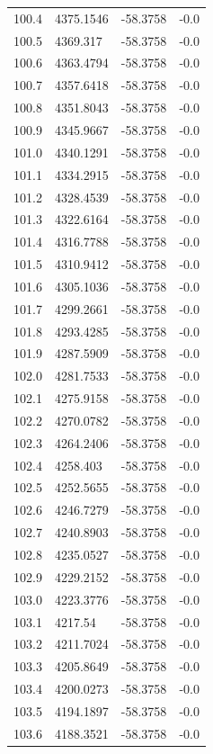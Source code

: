 \begin{table}[H]
\begin{tabular}{llll}
100.4 & 4375.1546 & -58.3758 & -0.0 \\
100.5 & 4369.317 & -58.3758 & -0.0 \\
100.6 & 4363.4794 & -58.3758 & -0.0 \\
100.7 & 4357.6418 & -58.3758 & -0.0 \\
100.8 & 4351.8043 & -58.3758 & -0.0 \\
100.9 & 4345.9667 & -58.3758 & -0.0 \\
101.0 & 4340.1291 & -58.3758 & -0.0 \\
101.1 & 4334.2915 & -58.3758 & -0.0 \\
101.2 & 4328.4539 & -58.3758 & -0.0 \\
101.3 & 4322.6164 & -58.3758 & -0.0 \\
101.4 & 4316.7788 & -58.3758 & -0.0 \\
101.5 & 4310.9412 & -58.3758 & -0.0 \\
101.6 & 4305.1036 & -58.3758 & -0.0 \\
101.7 & 4299.2661 & -58.3758 & -0.0 \\
101.8 & 4293.4285 & -58.3758 & -0.0 \\
101.9 & 4287.5909 & -58.3758 & -0.0 \\
102.0 & 4281.7533 & -58.3758 & -0.0 \\
102.1 & 4275.9158 & -58.3758 & -0.0 \\
102.2 & 4270.0782 & -58.3758 & -0.0 \\
102.3 & 4264.2406 & -58.3758 & -0.0 \\
102.4 & 4258.403 & -58.3758 & -0.0 \\
102.5 & 4252.5655 & -58.3758 & -0.0 \\
102.6 & 4246.7279 & -58.3758 & -0.0 \\
102.7 & 4240.8903 & -58.3758 & -0.0 \\
102.8 & 4235.0527 & -58.3758 & -0.0 \\
102.9 & 4229.2152 & -58.3758 & -0.0 \\
103.0 & 4223.3776 & -58.3758 & -0.0 \\
103.1 & 4217.54 & -58.3758 & -0.0 \\
103.2 & 4211.7024 & -58.3758 & -0.0 \\
103.3 & 4205.8649 & -58.3758 & -0.0 \\
103.4 & 4200.0273 & -58.3758 & -0.0 \\
103.5 & 4194.1897 & -58.3758 & -0.0 \\
103.6 & 4188.3521 & -58.3758 & -0.0 \\

\end{tabular}
\end{table}
